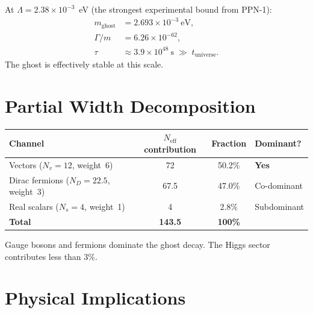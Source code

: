 \documentclass[11pt,a4paper]{article}
\newcommand{\Neff}{N_{\mathrm{eff}}}
\begin{document}
At $\Lambda = 2.38 \times 10^{-3}$~eV (the strongest experimental
bound from PPN-1):
\begin{align}
  m_{\mathrm{ghost}} &= 2.693 \times 10^{-3}~\text{eV}, \\
  \Gamma/m &= 6.26 \times 10^{-62}, \\
  \tau &\approx 3.9 \times 10^{48}~\text{s}
  \;\gg\; t_{\mathrm{universe}}.
\end{align}
The ghost is effectively stable at this scale.


\section{Partial Width Decomposition}
\label{sec:channels}

\begin{center}
\begin{tabular}{lccl}
\toprule
Channel & $\Neff$ contribution & Fraction & Dominant? \\
\midrule
Vectors ($N_v = 12$, weight~6) & 72 & 50.2\% &
  \textbf{Yes} \\
Dirac fermions ($N_D = 22.5$, weight~3) & 67.5 & 47.0\% &
  Co-dominant \\
Real scalars ($N_s = 4$, weight~1) & 4 & 2.8\% &
  Subdominant \\
\midrule
\textbf{Total} & \textbf{143.5} & \textbf{100\%} & \\
\bottomrule
\end{tabular}
\end{center}

\noindent
Gauge bosons and fermions dominate the ghost decay.  The Higgs sector
contributes less than 3\%.


\section{Physical Implications}
\label{sec:implications}
\end{document}
